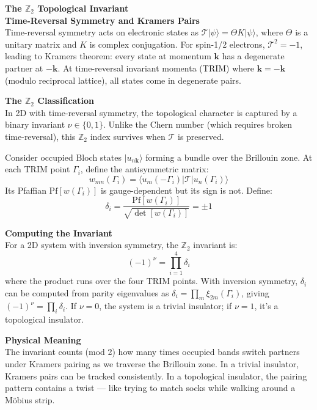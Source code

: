 \begin{technical}
{\Large\textbf{The $\mathbb{Z}_2$ Topological Invariant}}\\[0.3em]

\textbf{Time-Reversal Symmetry and Kramers Pairs}\\[0.5em]
Time-reversal symmetry acts on electronic states as $\mathcal{T}|\psi\rangle = \Theta K|\psi\rangle$, where $\Theta$ is a unitary matrix and $K$ is complex conjugation. For spin-1/2 electrons, $\mathcal{T}^2 = -1$, leading to Kramers theorem: every state at momentum $\mathbf{k}$ has a degenerate partner at $-\mathbf{k}$. At time-reversal invariant momenta (TRIM) where $\mathbf{k} = -\mathbf{k}$ (modulo reciprocal lattice), all states come in degenerate pairs.

\textbf{The $\mathbb{Z}_2$ Classification}\\[0.5em]
In 2D with time-reversal symmetry, the topological character is captured by a binary invariant $\nu \in \{0,1\}$. Unlike the Chern number (which requires broken time-reversal), this $\mathbb{Z}_2$ index survives when $\mathcal{T}$ is preserved.

Consider occupied Bloch states $|u_{n\mathbf{k}}\rangle$ forming a bundle over the Brillouin zone. At each TRIM point $\Gamma_i$, define the antisymmetric matrix:
\[
w_{mn}(\Gamma_i) = \langle u_m(-\Gamma_i)|\mathcal{T}|u_n(\Gamma_i)\rangle
\]
Its Pfaffian $\text{Pf}[w(\Gamma_i)]$ is gauge-dependent but its sign is not. Define:
\[
\delta_i = \frac{\text{Pf}[w(\Gamma_i)]}{\sqrt{\det[w(\Gamma_i)]}} = \pm 1
\]

\textbf{Computing the Invariant}\\[0.5em]
For a 2D system with inversion symmetry, the $\mathbb{Z}_2$ invariant is:
\[
(-1)^\nu = \prod_{i=1}^4 \delta_i
\]
where the product runs over the four TRIM points. With inversion symmetry, $\delta_i$ can be computed from parity eigenvalues as $\delta_i = \prod_m \xi_{2m}(\Gamma_i)$, giving $(-1)^\nu = \prod_i \delta_i$. If $\nu = 0$, the system is a trivial insulator; if $\nu = 1$, it's a topological insulator.

\columnbreak

\textbf{Physical Meaning}\\[0.5em]
The invariant counts (mod 2) how many times occupied bands switch partners under Kramers pairing as we traverse the Brillouin zone. In a trivial insulator, Kramers pairs can be tracked consistently. In a topological insulator, the pairing pattern contains a twist — like trying to match socks while walking around a Möbius strip.


\end{technical}
